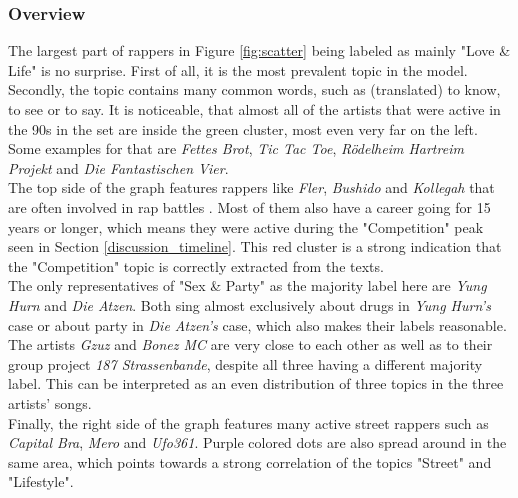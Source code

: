 \documentclass[conference]{IEEEtran}
\begin{document}
\subsubsection{Overview}
The largest part of rappers in Figure \ref{fig:scatter} being labeled as mainly "Love \& Life" is no surprise. First of all, it is the most prevalent topic in the model. Secondly, the topic contains many common words, such as (translated) to know, to see or to say. It is noticeable, that almost all of the artists that were active in the 90s in the set are inside the green cluster, most even very far on the left. Some examples for that are \textit{Fettes Brot}, \textit{Tic Tac Toe}, \textit{R\"odelheim Hartreim Projekt} and \textit{Die Fantastischen Vier}.\\
The top side of the graph features rappers like \textit{Fler}, \textit{Bushido} and \textit{Kollegah} that are often involved in rap battles \cite{battles}. Most of them also have a career going for 15 years or longer, which means they were active during the "Competition" peak seen in Section \ref{discussion_timeline}. This red cluster is a strong indication that the "Competition" topic is correctly extracted from the texts.\\
The only representatives of "Sex \& Party" as the majority label here are \textit{Yung Hurn} and \textit{Die Atzen}. Both sing almost exclusively about drugs in \textit{Yung Hurn's} case or about party in \textit{Die Atzen's} case, which also makes their labels reasonable.\\
The artists \textit{Gzuz} and \textit{Bonez MC} are very close to each other as well as to their group project \textit{187 Strassenbande}, despite all three having a different majority label. This can be interpreted as an even distribution of three topics in the three artists' songs.\\
Finally, the right side of the graph features many active street rappers \cite{strassenrap} such as \textit{Capital Bra}, \textit{Mero} and \textit{Ufo361}. Purple colored dots are also spread around in the same area, which points towards a strong correlation of the topics "Street" and "Lifestyle".
\end{document}
